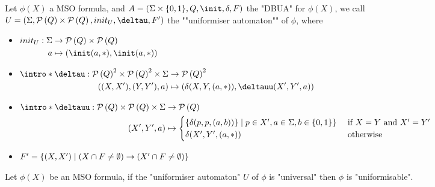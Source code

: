 \documentclass[twoside]{article}
\begin{document}
\begin{definition}
	Let $\phi(X)$ a MSO formula, and $A =  (\Sigma \times \{0,1\}, Q, \init, \delta, F)$ the "DBUA" for $\phi(X)$, we call $U = (\Sigma, \parts Q \times \parts Q,init_U, \deltau, F')$
	the ""uniformiser automaton"" of $\phi$, where
	\begin{itemize}
		\item$\begin{aligned}[t]
				      init_U : \Sigma & \to      \parts Q \times \parts {Q} \\
				      a               & \mapsto  ( \init(a,*), \init(a,*))
			      \end{aligned}$
		\item$\begin{aligned}[t]
				      \intro*\deltau : {\parts Q}^2 \times {\parts {Q}}^2 \times \Sigma & \to    {\parts {Q}}^2                           \\
				      ((X,X'),(Y,Y'),a)                                                 & \mapsto (\delta(X,Y,(a,*)), \deltauu (X',Y',a)) \\
			      \end{aligned}$
		\item $ \begin{aligned}[t]
				      \intro*\deltauu : \parts Q \times \parts Q \times \Sigma & \to \parts Q                                                                                                               \\
				      (X', Y', a)                                              & \mapsto \begin{cases}
					                                                                         \{\delta(p,p,(a,b))\}     \mid p \in X', a \in \Sigma, b \in \set{0,1}\} & \text{ if }  X = Y \text{ and } X' = Y' \\
					                                                                         \delta(X',Y',(a,*))                                                      & \text{ otherwise}
				                                                                         \end{cases}
			      \end{aligned}$
		\item $F' = \left\{(X,X') \mid (X \cap F \neq \emptyset) \rightarrow (X' \cap F \neq \emptyset)\right\}$
	\end{itemize}
\end{definition}

\begin{lemma}
	Let $\phi(X)$ be an MSO formula, if the "uniformiser automaton" $U$ of $\phi$ is "universal" then $\phi$ is "uniformisable".
\end{lemma}
\end{document}
